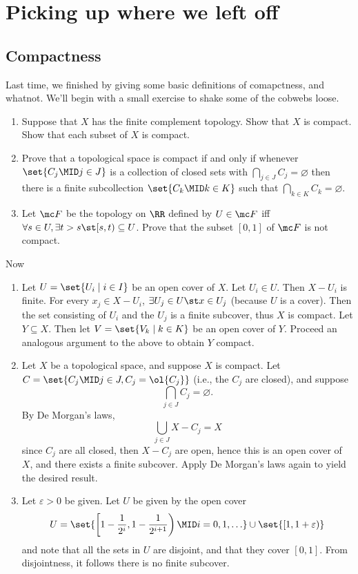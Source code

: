 \documentclass{fkbook}
\begin{document}
\section{Picking up where we left off}
\begin{adjustwidth}{1em}{1em}
  \subsection{Compactness}
  Last time, we finished by giving some basic definitions of
  comapctness, and whatnot. We'll begin with a small exercise to shake
  some of the cobwebs loose.
  \begin{enumerate}
    \item Suppose that $X$ has the finite complement topology. Show
      that $X$ is compact. Show that each subset of $X$ is compact.
    \item Prove that a topological space is compact if and only if
      whenever $\set{C_j \MID j \in J}$ is a collection of closed sets
      with $\bigcap_{j\in J} C_j = \varnothing$ then there is a finite
      subcollection $\set{C_k \MID k \in K}$ such that $\bigcap_{k \in
        K} C_k = \varnothing$.
    \item Let $\mc F$ be the topology on $\RR$ defined by $U \in \mc
      F$ iff $\forall s \in U, \exists t > s \st [s,t) \subseteq U$.
      Prove that the subset $[0,1]$ of $\mc F$ is not compact.
  \end{enumerate}
  Now
  \begin{enumerate}
    \item Let $U = \set{U_i \mid i \in I}$ be an open cover of $X$.
      Let $U_i \in U$. Then $X - U_i$ is finite. For every $x_j \in X
      - U_i$, $\exists U_j \in U \st x \in U_j$ (because $U$ is a
      cover). Then the set consisting of $U_i$ and the $U_j$ is a
      finite subcover, thus $X$ is compact. Let $Y \subseteq X$. Then
      let $V = \set{V_k \mid k \in K}$ be an open cover of $Y$.
      Proceed an analogous argument to the above to obtain $Y$
      compact.
    \item Let $X$ be a topological space, and suppose $X$ is compact.
      Let $C = \set{C_j \MID j \in J, C_j = \ol{C_j}}$ (i.e., the
      $C_j$ are closed), and suppose
      \[
        \bigcap_{j \in J} C_j = \varnothing.
      \]
      By De Morgan's laws,
      \[
        \bigcup_{j \in J} X - C_j = X
      \]
      since $C_j$ are all closed, then $X - C_j$ are open, hence this
      is an open cover of $X$, and there exists a finite subcover.
      Apply De Morgan's laws again to yield the desired result.
    \item Let $\varepsilon > 0$ be given. Let $U$ be given by the open
      cover
      \[
        U = %
          \set{ \left[ 1 - \frac{1}{2^i}, 1 - \frac{1}{2^{i +
                1}}\right) \MID i = 0, 1, \ldots }%
      \cup %
        \set{\left[1, 1 + \varepsilon \right)}%
      \]
      and note that all the sets in $U$ are disjoint, and that they
      cover $[0,1]$. From disjointness, it follows there is no finite
      subcover.
  \end{enumerate}

\end{adjustwidth}
\end{document}

